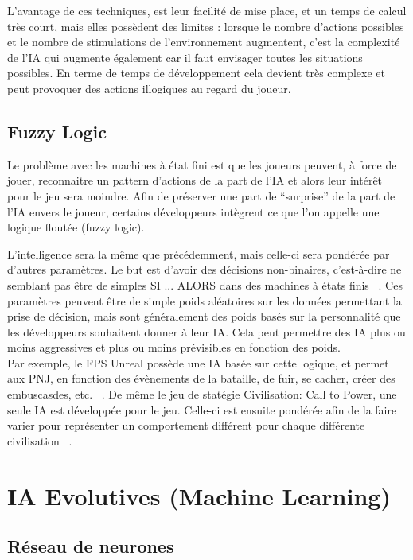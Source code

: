 \documentclass[asi]{picINSA}
\begin{document}
L'avantage de ces techniques, est leur facilité de mise place, et un temps de calcul très court, mais elles possèdent des limites : lorsque le nombre d’actions possibles et le nombre de stimulations de l’environnement augmentent, c’est la complexité de l’IA qui augmente également car il faut envisager toutes les situations possibles. En terme de temps de développement cela devient très complexe et peut provoquer des actions illogiques au regard du joueur.

\section{Fuzzy Logic}
Le problème avec les machines à état fini est que les joueurs peuvent, à force de jouer, reconnaitre un pattern d'actions de la part de l'IA et alors leur intérêt pour le jeu sera moindre. Afin de préserver une part de ``surprise'' de la part de l'IA envers le joueur, certains développeurs intègrent ce que l'on appelle une logique floutée (fuzzy logic).

L'intelligence sera la même que précédemment, mais celle-ci sera pondérée par d'autres paramètres. Le but est d'avoir des décisions non-binaires, c'est-à-dire ne semblant pas être de simples SI ... ALORS dans des machines à états finis ~\cite{CompGamesWithIntel}.
Ces paramètres peuvent être de simple poids aléatoires sur les données permettant la prise de décision, mais sont généralement des poids basés sur la personnalité que les développeurs souhaitent donner à leur IA. Cela peut permettre des IA plus ou moins aggressives et plus ou moins prévisibles en fonction des poids.\\

Par exemple, le FPS Unreal possède une IA basée sur cette logique, et permet aux PNJ, en fonction des évènements de la bataille, de fuir, se cacher, créer des embuscasdes, etc. ~\cite{CompGamesWithIntel}.
De même le jeu de statégie Civilisation: Call to Power, une seule IA est développée pour le jeu. Celle-ci est ensuite pondérée afin de la faire varier pour représenter un comportement différent pour chaque différente civilisation ~\cite{CompGamesWithIntel}. 


\chapter{IA Evolutives (Machine Learning)}
\section{Réseau de neurones}
\end{document}
